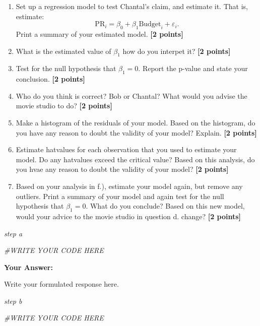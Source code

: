 \documentclass[
]{article}
\newenvironment{Shaded}{\begin{snugshade}}{\end{snugshade}}
\newcommand{\CommentTok}[1]{\textcolor[rgb]{0.56,0.35,0.01}{\textit{#1}}}
\providecommand{\tightlist}{%
  \setlength{\itemsep}{0pt}\setlength{\parskip}{0pt}}
\begin{document}
\begin{enumerate}
\def\labelenumi{\alph{enumi}.}
\tightlist
\item
  Set up a regression model to test Chantal's claim, and estimate it.
  That is, estimate:
  \[\text{PR}_i=\beta_0+\beta_1 \text{Budget}_i +\varepsilon_i.\] Print
  a summary of your estimated model. \textbf{[2 points]}
\item
  What is the estimated value of \(\beta_1\) how do you interpet it?
  \textbf{[2 points]}
\item
  Test for the null hypothesis that \(\beta_1 = 0\). Report the p-value
  and state your conclusion. \textbf{[2 points]}
\item
  Who do you think is correct? Bob or Chantal? What would you advise the
  movie studio to do? \textbf{[2 points]}
\item
  Make a histogram of the residuals of your model. Based on the
  histogram, do you have any reason to doubt the validity of your model?
  Explain. \textbf{[2 points]}
\item
  Estimate hatvalues for each observation that you used to estimate your
  model. Do any hatvalues exceed the critical value? Based on this
  analysis, do you hvae any reason to doubt the validity of your model?
  \textbf{[2 points]}
\item
  Based on your analysis in f.), estimate your model again, but remove
  any outliers. Print a summary of your model and again test for the
  null hypothesis that \(\beta_1 = 0\). What do you conclude? Based on
  this new model, would your advice to the movie studio in question d.
  change? \textbf{[2 points]}
\end{enumerate}

\emph{step a}

\begin{Shaded}
\begin{Highlighting}[]
\CommentTok{\#WRITE YOUR CODE HERE}
\end{Highlighting}
\end{Shaded}

\textbf{Your Answer:}

Write your formulated response here.

\emph{step b}

\begin{Shaded}
\begin{Highlighting}[]
\CommentTok{\#WRITE YOUR CODE HERE}
\end{Highlighting}
\end{Shaded}
\end{document}
